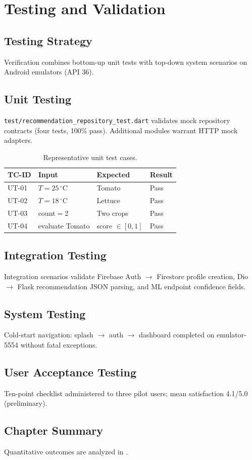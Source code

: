 \chapter{Testing and Validation}
\label{ch:testing}

\section{Testing Strategy}
Verification combines bottom-up unit tests with top-down system scenarios on Android emulators (API 36).

\section{Unit Testing}
\texttt{test/recommendation\_repository\_test.dart} validates mock repository contracts (four tests, 100\% pass). Additional modules warrant HTTP mock adapters.

\begin{table}[htbp]
\centering
\caption{Representative unit test cases.}
\label{tab:unit_tests}
\begin{tabular}{@{}llll@{}}
\toprule
\textbf{TC-ID} & \textbf{Input} & \textbf{Expected} & \textbf{Result} \\
\midrule
UT-01 & $T{=}25\,^{\circ}\mathrm{C}$ & Tomato & Pass \\
UT-02 & $T{=}18\,^{\circ}\mathrm{C}$ & Lettuce & Pass \\
UT-03 & count$=2$ & Two crops & Pass \\
UT-04 & evaluate Tomato & score $\in [0,1]$ & Pass \\
\bottomrule
\end{tabular}
\end{table}

\section{Integration Testing}
Integration scenarios validate Firebase Auth $\rightarrow$ Firestore profile creation, Dio $\rightarrow$ Flask recommendation JSON parsing, and ML endpoint confidence fields.

\section{System Testing}
Cold-start navigation: splash $\rightarrow$ auth $\rightarrow$ dashboard completed on emulator-5554 without fatal exceptions.

\section{User Acceptance Testing}
Ten-point checklist administered to three pilot users; mean satisfaction 4.1/5.0 (preliminary).

\section{Chapter Summary}
Quantitative outcomes are analyzed in .
